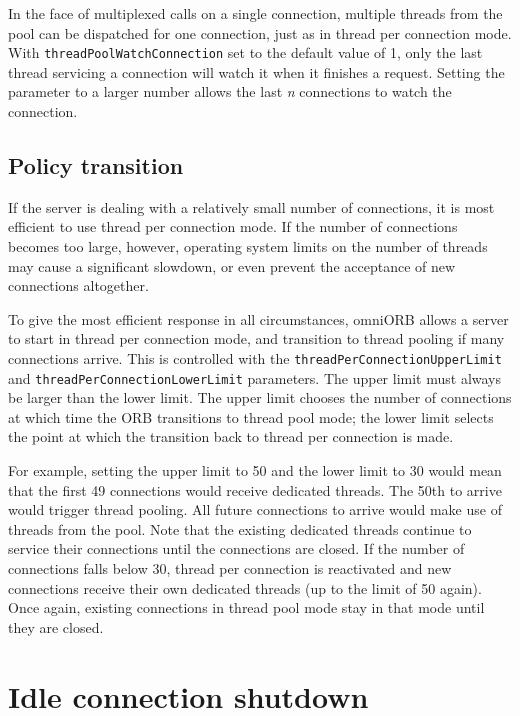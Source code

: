 \documentclass[11pt,oneside,a4paper]{book}
\newcommand{\code}[1]{\texttt{#1}}
\newcommand{\dsc}{\discretionary{}{}{}}
\begin{document}
In the face of multiplexed calls on a single connection, multiple
threads from the pool can be dispatched for one connection, just as in
thread per connection mode. With \code{threadPoolWatchConnection} set
to the default value of 1, only the last thread servicing a connection
will watch it when it finishes a request. Setting the parameter to a
larger number allows the last \emph{n} connections to watch the
connection.


\subsection{Policy transition}

If the server is dealing with a relatively small number of
connections, it is most efficient to use thread per connection mode.
If the number of connections becomes too large, however, operating
system limits on the number of threads may cause a significant
slowdown, or even prevent the acceptance of new connections
altogether.

To give the most efficient response in all circumstances, omniORB
allows a server to start in thread per connection mode, and transition
to thread pooling if many connections arrive. This is controlled with
the \code{threadPerConnection\dsc{}UpperLimit} and
\code{threadPerConnectionLowerLimit} parameters. The upper limit must
always be larger than the lower limit. The upper limit chooses the
number of connections at which time the ORB transitions to thread pool
mode; the lower limit selects the point at which the transition back
to thread per connection is made.

For example, setting the upper limit to 50 and the lower limit to 30
would mean that the first 49 connections would receive dedicated
threads. The 50th to arrive would trigger thread pooling. All future
connections to arrive would make use of threads from the pool. Note
that the existing dedicated threads continue to service their
connections until the connections are closed. If the number of
connections falls below 30, thread per connection is reactivated and
new connections receive their own dedicated threads (up to the limit
of 50 again). Once again, existing connections in thread pool mode
stay in that mode until they are closed.


\section{Idle connection shutdown}
\label{sec:connShutdown}
\end{document}
